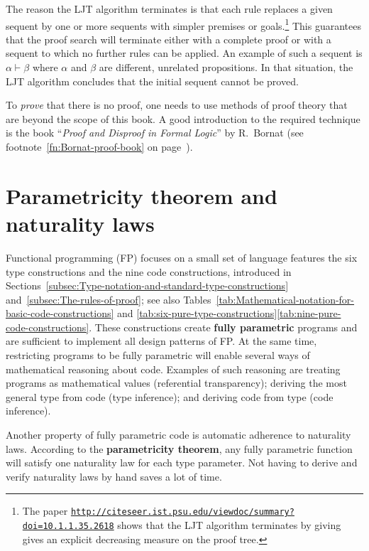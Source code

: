 The reason the LJT algorithm terminates is that each rule replaces
a given sequent by one or more sequents with simpler premises or goals.\footnote{The paper \texttt{\href{http://citeseer.ist.psu.edu/viewdoc/summary?doi=10.1.1.35.2618}{http://citeseer.ist.psu.edu/viewdoc/summary?doi=10.1.1.35.2618}}
shows that the LJT algorithm terminates by giving gives an explicit
decreasing measure on the proof tree.} This guarantees that the proof search will terminate either with
a complete proof or with a sequent to which no further rules can be
applied. An example of such a sequent is $\alpha\vdash\beta$ where
$\alpha$ and $\beta$ are different, unrelated propositions. In that
situation, the LJT algorithm concludes that the initial sequent cannot
be proved.

To \emph{prove} that there is no proof, one needs to use methods
of proof theory that are beyond the scope of this book. A good introduction
to the required technique is the book \textsf{``}\emph{Proof and Disproof
in Formal Logic}\textsf{''} by R.~Bornat (see footnote~\ref{fn:Bornat-proof-book}
on page~\pageref{fn:Bornat-proof-book}).

\chapter{Parametricity theorem and naturality laws\label{app:Proofs-of-naturality-parametricity}}

Functional programming (FP) focuses on a small set of language features
\textemdash{} the six type constructions and the nine code constructions,
introduced in Sections~\ref{subsec:Type-notation-and-standard-type-constructions}
and~\ref{subsec:The-rules-of-proof}; see also Tables~\ref{tab:Mathematical-notation-for-basic-code-constructions}
and \ref{tab:six-pure-type-constructions}\textendash \ref{tab:nine-pure-code-constructions}.
These constructions create \textbf{fully parametric} programs
and are sufficient to implement all design patterns of FP. At the
same time, restricting programs to be fully parametric will enable
several ways of mathematical reasoning about code. Examples of such
reasoning are treating programs as mathematical values (referential
transparency); deriving the most general type from code (type inference);
and deriving code from type (code inference).

Another property of fully parametric code is automatic adherence to
naturality laws. According to the \textbf{parametricity theorem},
any fully parametric function will satisfy one naturality law for
each type parameter. Not having to derive and verify naturality laws
by hand saves a lot of time.


